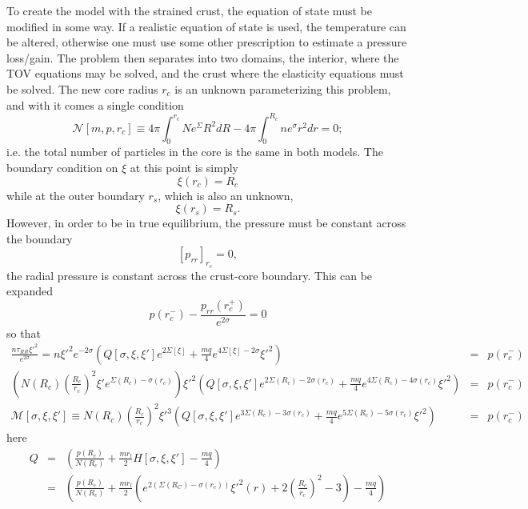 To create the model with the strained crust, the equation of state must be modified in some way. If a realistic equation of state is used, the temperature can be altered, otherwise one must use some other prescription to estimate a pressure loss/gain. The problem then separates into two domains, the interior, where the TOV equations may be solved, and the crust where the elasticity equations must be solved. The new core radius $r_c$ is an unknown parameterizing this problem, and with it comes a single condition
\begin{equation}
\mathcal{N}[m,p,r_c] \equiv 4\pi\int_0^{r_c}{Ne^{\Sigma}R^2dR} - 4\pi\int_0^{R_c}{ne^{\sigma}r^2dr} = 0;
\label{eq:coreNumberConservation}
\end{equation}
i.e. the total number of particles in the core is the same in both models. The boundary condition on $\xi$ at this point is simply
\begin{equation}
\xi(r_c) = R_c
\end{equation}
while at the outer boundary $r_s$, which is also an unknown,
\begin{equation}
\xi(r_s) = R_s.
\end{equation}
However, in order to be in true equilibrium, the pressure must be constant across the boundary
\begin{equation}
\left[p_{rr}\right]_{r_c} = 0,
\end{equation}
the radial pressure is constant across the crust-core boundary. This can be expanded
\begin{equation}
p(r_c^-) - \frac{p_{rr}(r_c^+)}{e^{2\sigma}} = 0
\end{equation}
so that
\begin{eqnarray}
\frac{n\tau_{RR}\xi'^2}{e^{2\sigma}} = n\xi'^2e^{-2\sigma}\left(Q[\sigma,\xi,\xi']e^{2\Sigma[\xi]} +
\frac{mq}{4}e^{4\Sigma[\xi]-2\sigma}\xi'^2\right) & = & p(r_c^-) \\
\left(N(R_c)\left(\frac{R_c}{r_c}\right)^2\xi'e^{\Sigma(R_c)-\sigma(r_c)}\right)\xi'^2\left(Q[\sigma,\xi,\xi']e^{2\Sigma(R_c)-2\sigma(r_c)} + \frac{mq}{4}e^{4\Sigma(R_c)-4\sigma(r_c)}\xi'^2\right)& = & p(r_c^-) \\
\label{eq:coreBoundaryPressure}\mathcal{M}[\sigma,\xi,\xi'] \equiv N(R_c)\left(\frac{R_c}{r_c}\right)^2\xi'^3\left(Q[\sigma,\xi,\xi']e^{3\Sigma(R_c)-3\sigma(r_c)} + \frac{mq}{4}e^{5\Sigma(R_c)-5\sigma(r_c)}\xi'^2\right)& = & p(r_c^-)
\end{eqnarray}
here
\begin{eqnarray}
Q & = & \left(\frac{p(R_c)}{N(R_c)} +
\frac{mr_l}{2}H[\sigma,\xi,\xi']-\frac{mq}{4}\right) \\
& = & \left(\frac{p(R_c)}{N(R_c)} +
\frac{mr_l}{2}\left(e^{2(\Sigma(R_C)-\sigma(r_c))}\xi'^2(r) +
2\left(\frac{R_c}{r_c}\right)^2 - 3\right)-\frac{mq}{4}\right)
\end{eqnarray}

